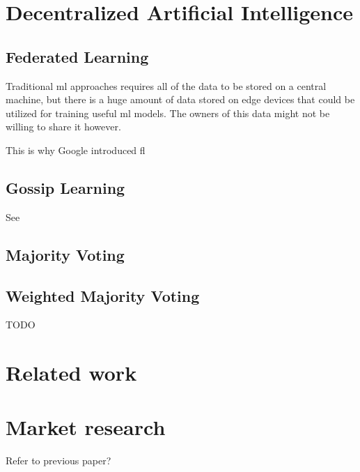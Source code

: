\section{Decentralized Artificial Intelligence}
\subsection{Federated Learning}
\label{sec:federated-learning}

Traditional \acrfull{ml} approaches requires all of the data to be stored on a central machine, but there is a huge amount of data stored on edge devices that could be utilized for training useful \acrshort{ml} models. The owners of this data might not be willing to share it however.

This is why Google introduced \acrfull{fl} \cite{mcmahan2016communicationefficient}

\subsection{Gossip Learning}
\label{sec:federated-learning}

See \cite{gossiplearningalternative}

\subsection{Majority Voting}
\label{sec:mv}

\subsection{Weighted Majority Voting}
\label{sec:wmv}

TODO

\section{Related work}

\section{Market research}

Refer to previous paper?